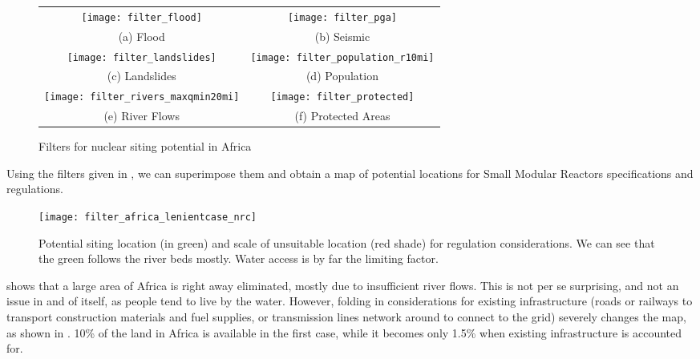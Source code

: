 \begin{figure*}
\begin{tabular}{cc}
  \texttt{[image: filter\_flood]} &   \texttt{[image: filter\_pga]} \\
(a) Flood & (b) Seismic \\[6pt]
 \texttt{[image: filter\_landslides]} &   \texttt{[image: filter\_population\_r10mi]} \\
(c) Landslides & (d) Population\\[6pt]
 \texttt{[image: filter\_rivers\_maxqmin20mi]} &   \texttt{[image: filter\_protected]} \\
(e) River Flows & (f) Protected Areas \\[6pt]
\end{tabular}
\caption{Filters for nuclear siting potential in Africa}
\end{figure*}

Using the filters given in , we can superimpose them and obtain a map of potential locations for Small Modular Reactors specifications and regulations.



\begin{figure}[h]
	\texttt{[image: filter\_africa\_lenientcase\_nrc]}
	\caption[Potential siting location (in green) and scale of unsuitable location (red shade) for regulation considerations. We can see that the green follows the river beds mostly. Water access is by far the limiting factor.]{Potential siting location (in green) and scale of unsuitable location (red shade) for regulation considerations. We can see that the green follows the river beds mostly. Water access is by far the limiting factor.}
\end{figure}

 shows that a large area of Africa is right away eliminated, mostly due to insufficient river flows. This is not per se surprising, and not an issue in and of itself, as people tend to live by the water. However, folding in considerations for existing infrastructure (roads or railways to transport construction materials and fuel supplies, or transmission lines network around to connect to the grid) severely changes the map, as shown in . 10\% of the land in Africa is available in the first case, while it becomes only 1.5\% when existing infrastructure is accounted for.


